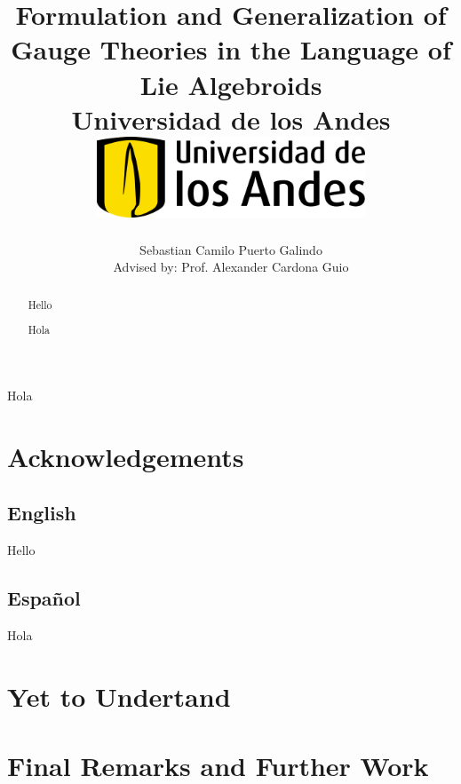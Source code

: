 \documentclass[12pt]{report}
\title 
{
	{Formulation and Generalization of Gauge Theories in the Language of Lie Algebroids}\\
	{\large Universidad de los Andes}\\
	\vspace{1.5cm}
	{\includegraphics[width = 0.6\textwidth]{logo.png}}	
}
\author{Sebastian Camilo Puerto Galindo\\[1cm]{\small Advised by: Prof. Alexander Cardona Guio}}
\newenvironment{dedication}
  {\clearpage           %
   \thispagestyle{empty}%
   \vspace*{\stretch{1}}%
   \raggedleft          %
  }
  {\par %
   \vspace{\stretch{3}} %
   \clearpage           %
  }
\theoremstyle{definition}
\begin{document}

\maketitle

\begin{dedication}
{\LARGE\calligra Hola}
\end{dedication}

\begin{abstract}
Hello
\end{abstract}

\begin{otherlanguage}{spanish}
\begin{abstract}
Hola
\end{abstract}
\end{otherlanguage}

\newpage

\chapter*{Acknowledgements}

\section*{English}
Hello
\begin{otherlanguage}{spanish}
\section*{Español}
Hola
\end{otherlanguage}

\tableofcontents


\chapter{Yet to Undertand}


\chapter{Final Remarks and Further Work}

\end{document}
